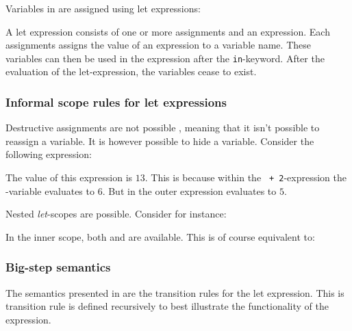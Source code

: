 Variables in \productname{} are assigned using let expressions:

\begin{ebnf}
\end{ebnf}

A let expression consists of one or more assignments and an expression. Each
assignments assigns the value of an expression to a variable name. These
variables can then be used in the expression after the \texttt{in}-keyword.
After the evaluation of the let-expression, the variables cease to exist.

\subsubsection{Informal scope rules for let expressions}

Destructive assignments are not possible \productname{}, meaning that it isn't possible to 
reassign a variable. It is however possible to hide a variable.
Consider the following expression:


The value of this expression is $13$. This is because within the \texttt{ + 2}-expression
the -variable evaluates to $6$. But in the outer expression  evaluates to
$5$.

Nested \emph{let}-scopes are possible. Consider for instance:


In the inner scope, both  and  are available. This is of course equivalent
to:


\subsubsection{Big-step semantics}

The semantics presented in  are the transition rules for
the let expression.  This is transition rule is defined recursively to best
illustrate the functionality of the expression.

